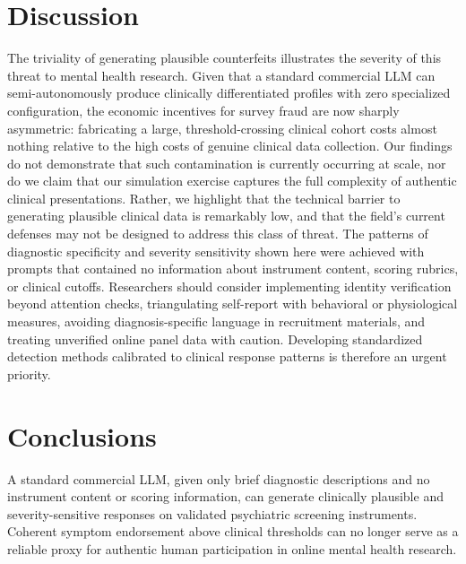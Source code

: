 \documentclass[12pt]{article}
\begin{document}
\section*{Discussion}

The triviality of generating plausible counterfeits illustrates the severity of this threat to mental health research. Given that a standard commercial LLM can semi-autonomously produce clinically differentiated profiles with zero specialized configuration, the economic incentives for survey fraud are now sharply asymmetric: fabricating a large, threshold-crossing clinical cohort costs almost nothing relative to the high costs of genuine clinical data collection. Our findings do not demonstrate that such contamination is currently occurring at scale, nor do we claim that our simulation exercise captures the full complexity of authentic clinical presentations. Rather, we highlight that the technical barrier to generating plausible clinical data is remarkably low, and that the field's current defenses may not be designed to address this class of threat. The patterns of diagnostic specificity and severity sensitivity shown here were achieved with prompts that contained no information about instrument content, scoring rubrics, or clinical cutoffs. Researchers should consider implementing identity verification beyond attention checks, triangulating self-report with behavioral or physiological measures, avoiding diagnosis-specific language in recruitment materials, and treating unverified online panel data with caution.\cite{quagan_navigating_2021} Developing standardized detection methods calibrated to clinical response patterns is therefore an urgent priority.

\section*{Conclusions}

A standard commercial LLM, given only brief diagnostic descriptions and no instrument content or scoring information, can generate clinically plausible and severity-sensitive responses on validated psychiatric screening instruments. Coherent symptom endorsement above clinical thresholds can no longer serve as a reliable proxy for authentic human participation in online mental health research.
\end{document}
